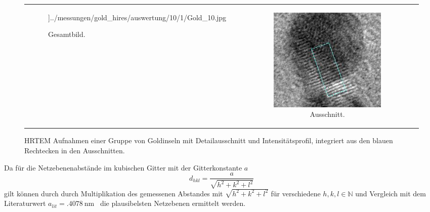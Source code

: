 \documentclass[slug=TEM, room=IFW, supervisor=?, coursedate=23.\ 01.\ 2020]{../../Lab_Report_LaTeX/lab_report}
\begin{document}
\begin{figure}[hpt]
\begin{tabular}[htp]{l|ccc}
\begin{subfigure}{.29\textwidth}
        ]{../messungen/gold_hires/auswertung/10/1/Gold_10.jpg}%
        \caption{Gesamtbild.}
        \label{fig:gold_hires-picture_4}
      \end{subfigure}
    &
      \begin{subfigure}{.29\textwidth}
        \centering
        \includegraphics[width=.8\textwidth]{../messungen/gold_hires/auswertung/10/1/Gold_10s.jpg}%
        \caption{Ausschnitt.}
        \label{fig:gold_hires-detail_4}
      \end{subfigure}
  \end{tabular}


  \caption[HRTEM Aufnahmen]{HRTEM Aufnahmen einer Gruppe von
    Goldinseln mit Detailausschnitt und Intensitätsprofil, integriert
    aus den blauen Rechtecken in den Ausschnitten.}\label{fig:hrtem}
\end{figure}


Da f\"ur die Netzebenenabst\"ande im kubischen Gitter mit der
Gitterkonstante \(a\)
\begin{equation}
  \label{eq:cubd}
  d_{hkl} = \frac{a}{\sqrt{h^2+k^2+l^2}}
\end{equation}
gilt k\"onnen durch durch Multiplikation des gemessenen Abstandes mit
\({\sqrt{h^2+k^2+l^2}}\) f\"ur verschiedene \(h,k,l\in\mathbb{N}\) und
Vergleich mit dem Literaturwert
\(a_{lit}=\SI{.4078}{\nano\meter}\)~\cite{Wyckoff1968} die plausibelsten
Netzebenen ermittelt werden.
\end{document}
